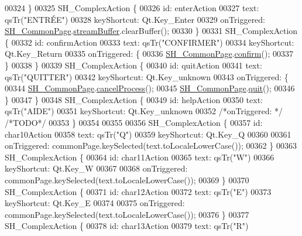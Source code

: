 \begin{DoxyCode}
00324     \}
00325     SH\_ComplexAction \{
00326         \textcolor{keywordtype}{id}: enterAction
00327         text: qsTr(\textcolor{stringliteral}{"ENTRÉE"})
00328         keyShortcut: Qt.Key\_Enter
00329         onTriggered: \hyperlink{classSH__CommonPage}{SH\_CommonPage}.\hyperlink{classSH__CommonPage_af59ae18e73706e3622c000c2005d9550}{streamBuffer}.clearBuffer();
00330     \}
00331     SH\_ComplexAction \{
00332         \textcolor{keywordtype}{id}: confirmAction
00333         text: qsTr(\textcolor{stringliteral}{"CONFIRMER"})
00334         keyShortcut: Qt.Key\_Return
00335         onTriggered: \{
00336             \hyperlink{classSH__CommonPage}{SH\_CommonPage}.\hyperlink{classSH__CommonPage_a66387106e42e843b3fd3ffbbcabbb8eb}{confirm}();
00337         \}
00338     \}
00339     SH\_ComplexAction \{
00340         \textcolor{keywordtype}{id}: quitAction
00341         text: qsTr(\textcolor{stringliteral}{"QUITTER"})
00342         keyShortcut: Qt.Key\_unknown
00343         onTriggered: \{
00344             \hyperlink{classSH__CommonPage}{SH\_CommonPage}.\hyperlink{classSH__CommonPage_a500427619a33ea991ed173fa0ac3b446}{cancelProcess}();
00345             \hyperlink{classSH__CommonPage}{SH\_CommonPage}.\hyperlink{classSH__CommonPage_a5b15093af63a454ca459407ba1283038}{quit}();
00346         \}
00347     \}
00348     SH\_ComplexAction \{
00349         \textcolor{keywordtype}{id}: helpAction
00350         text: qsTr(\textcolor{stringliteral}{"AIDE"})
00351         keyShortcut: Qt.Key\_unknown
00352         \textcolor{comment}{/*onTriggered: */} \textcolor{comment}{/*TODO*/}
00353     \}
00354 
00355 
00356     SH\_ComplexAction \{
00357         \textcolor{keywordtype}{id}: char10Action
00358         text: qsTr(\textcolor{stringliteral}{"Q"})
00359         keyShortcut: Qt.Key\_Q
00360 
00361         onTriggered: commonPage.keySelected(text.toLocaleLowerCase());
00362     \}
00363     SH\_ComplexAction \{
00364         \textcolor{keywordtype}{id}: char11Action
00365         text: qsTr(\textcolor{stringliteral}{"W"})
00366         keyShortcut: Qt.Key\_W
00367 
00368         onTriggered: commonPage.keySelected(text.toLocaleLowerCase());
00369     \}
00370     SH\_ComplexAction \{
00371         \textcolor{keywordtype}{id}: char12Action
00372         text: qsTr(\textcolor{stringliteral}{"E"})
00373         keyShortcut: Qt.Key\_E
00374 
00375         onTriggered: commonPage.keySelected(text.toLocaleLowerCase());
00376     \}
00377     SH\_ComplexAction \{
00378         \textcolor{keywordtype}{id}: char13Action
00379         text: qsTr(\textcolor{stringliteral}{"R"})

\end{DoxyCode}
